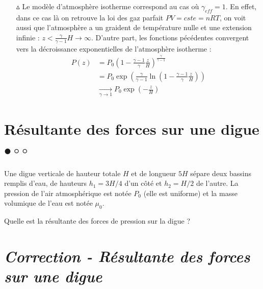 \documentclass{report}
\begin{document}
\begin{itemize}
	\item[$\vartriangle$] Le modèle d'atmosphère isotherme correspond au cas où $\gamma_{eff}=1$. En effet, dans ce cas là on retrouve la loi des gaz parfait $PV=cste=nRT$, on voit aussi que l'atmosphère a un graident de température nulle et une extension infinie : $z<\frac{\gamma}{\gamma-1}H\longrightarrow\infty$. D'autre part, les fonctions pécédentes convergent vers la décroissance exponentielles de l'atmosphère isotherme :
	\begin{align*}
		P(z)&=P_0\left(1-\frac{\gamma-1}{\gamma}\frac{z}{H} \right)^{\frac{\gamma}{\gamma-1}}\\
		&=P_0\exp\left(\frac{\gamma}{\gamma-1}\ln\left(1-\frac{\gamma-1}{\gamma}\frac{z}{H} \right)\right) \\
		&\xrightarrow[\gamma\to1]{} P_0\exp\left(-\frac{z}{H} \right) 
	\end{align*}

\end{itemize}

\newpage

\section*{Résultante des forces sur une digue $\bullet\circ\circ$}

Une digue verticale de hauteur totale $H$ et de longueur $5H$ sépare deux bassins remplis d'eau, de hauteurs $h_1=3H/4$ d'un côté et $h_2=H/2$ de l'autre. La pression de l'air atmosphérique est notée $P_0$ (elle est uniforme) et la masse volumique de l'eau est notée $\mu_0$.

Quelle est la résultante des forces de pression sur la digue ?

\newpage

\section*{\textit{Correction - Résultante des forces sur une digue}}
\end{document}
